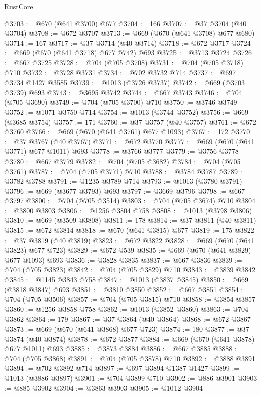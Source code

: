 \begin{lexlean}{RustCore}
\begin{coremodule}
@3703 := @670 (@641 @3700) @677
@3704 := 166
@3707 := @37 @3704 (@40 @3704)
@3708 := @672 @3707
@3713 := @669 (@670 (@641 @3708) @677 @680)
@3714 := 167
@3717 := @37 @3714 (@40 @3714)
@3718 := @672 @3717
@3724 := @669 (@670 (@641 @3718) @677 @742) @693
@3725 := @3713 @3724
@3726 := @667 @3725
@3728 := @704 (@705 @3708)
@3731 := @704 (@705 @3718) @710
@3732 := @3728 @3731
@3734 := @702 @3732 @714
@3737 := @697 @3734 @1427 @3585
@3739 := @1013 (@3726 @3737)
@3742 := @669 (@3703 @3739) @693
@3743 := @3695 @3742
@3744 := @667 @3743
@3746 := @704 (@705 @3690)
@3749 := @704 (@705 @3700) @710
@3750 := @3746 @3749
@3752 := @1071 @3750 @714
@3754 := @1013 (@3744 @3752)
@3756 := @669 (@3685 @3754)
@3757 := 171
@3760 := @37 @3757 (@40 @3757)
@3761 := @672 @3760
@3766 := @669 (@670 (@641 @3761) @677 @1093)
@3767 := 172
@3770 := @37 @3767 (@40 @3767)
@3771 := @672 @3770
@3777 := @669 (@670 (@641 @3771) @677 @1011) @693
@3778 := @3766 @3777
@3779 := @3756 @3778
@3780 := @667 @3779
@3782 := @704 (@705 @3682)
@3784 := @704 (@705 @3761)
@3787 := @704 (@705 @3771) @710
@3788 := @3784 @3787
@3789 := @3782 @3788
@3791 := @1235 @3789 @714
@3793 := @1013 (@3780 @3791)
@3796 := @669 (@3677 @3793) @693
@3797 := @3669 @3796
@3798 := @667 @3797
@3800 := @704 (@705 @3514)
@3803 := @704 (@705 @3674) @710
@3804 := @3800 @3803
@3806 := @1256 @3804 @758
@3808 := @1013 (@3798 @3806)
@3810 := @669 (@3509 @3808)
@3811 := 178
@3814 := @37 @3811 (@40 @3811)
@3815 := @672 @3814
@3818 := @670 (@641 @3815) @677
@3819 := 175
@3822 := @37 @3819 (@40 @3819)
@3823 := @672 @3822
@3828 := @669 (@670 (@641 @3823) @677 @723)
@3829 := @672 @539
@3835 := @669 (@670 (@641 @3829) @677 @1093) @693
@3836 := @3828 @3835
@3837 := @667 @3836
@3839 := @704 (@705 @3823)
@3842 := @704 (@705 @3829) @710
@3843 := @3839 @3842
@3845 := @1145 @3843 @758
@3847 := @1013 (@3837 @3845)
@3850 := @669 (@3818 @3847) @693
@3851 := @3810 @3850
@3852 := @667 @3851
@3854 := @704 (@705 @3506)
@3857 := @704 (@705 @3815) @710
@3858 := @3854 @3857
@3860 := @1256 @3858 @758
@3862 := @1013 (@3852 @3860)
@3863 := @704 @3862
@3864 := 179
@3867 := @37 @3864 (@40 @3864)
@3868 := @672 @3867
@3873 := @669 (@670 (@641 @3868) @677 @723)
@3874 := 180
@3877 := @37 @3874 (@40 @3874)
@3878 := @672 @3877
@3884 := @669 (@670 (@641 @3878) @677 @1011) @693
@3885 := @3873 @3884
@3886 := @667 @3885
@3888 := @704 (@705 @3868)
@3891 := @704 (@705 @3878) @710
@3892 := @3888 @3891
@3894 := @702 @3892 @714
@3897 := @697 @3894 @1387 @1427
@3899 := @1013 (@3886 @3897)
@3901 := @704 @3899 @710
@3902 := @886 @3901
@3903 := @885 @3902
@3904 := @3863 @3903
@3905 := @1012 @3904

\end{coremodule}
\end{lexlean}
